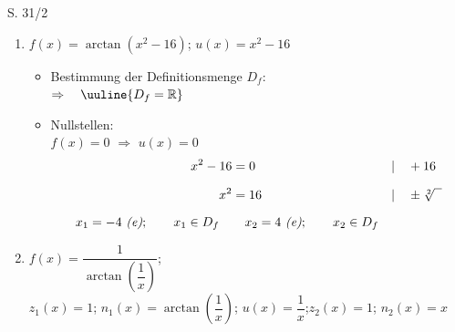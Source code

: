 \begin{Exercise}{S. 31/2}{}
\begin{enumerate}
\begin{enumerate}[label=\alph*)]
{\begin{itemize}[leftmargin=*]
{                        $\Rightarrow \quad \uuline{D_{f} = \left[ \ 3; \infty \ \right[}$
                        }\\[-1.0ex]
                    \item Nullstellen: \\[1.0ex]{
                        $f(x) = 0$ \qquad $\Rightarrow$ \qquad $u(x) = 0$\\[-2.0ex]
                        \begin{align*}
                            x_{1} &= 3 \ \text{\textit{(e)}}; \qquad x_{1} \in D_{f} &&
                        \end{align*}
                        }
                \end{itemize}
                }
            \item[b)] {
                $f(x) = \arctan\left(x^{2} - 16\right)$; \qquad $u(x) = x^{2} - 16$\\[-2.0ex]
                \begin{itemize}[leftmargin=*]
                    \item Bestimmung der Definitionsmenge $D_{f}$: \\[1.0ex]{
                        $\Rightarrow \quad \uuline{D_{f} = \mathbb{R}}$
                        }\\[-1.0ex]
                    \item Nullstellen: \\[1.0ex]{
                        $f(x) = 0$ \qquad $\Rightarrow$ \qquad $u(x) = 0$\\[-2.0ex]
                        \begin{align*}
                            x^{2} - 16 &= 0 &&| \quad + 16\\[1.5ex]
                            x^{2} &= 16 &&| \quad \pm \sqrt[2]{\phantom{x}}\\[1.5ex]
                            x_{1} = -4 \ \text{\textit{(e)}}; \qquad x_{1} \in D_{f} \quad & \quad x_{2} = 4 \ \text{\textit{(e)}}; \qquad x_{2} \in D_{f} &&
                        \end{align*}
                        }
                \end{itemize}
                }
            \item[c)] {
                $f(x) = \dfrac{1}{\arctan\left(\dfrac{1}{x}\right)}$; \\[2.0ex]
                $z_{1}(x) = 1$; \qquad $n_{1}(x) = \arctan\left(\dfrac{1}{x}\right)$; \qquad $u(x) = \dfrac{1}{x}$;\qquad $z_{2}(x) = 1$; \qquad $n_{2}(x) = x$ \\[-2.0ex]
}
\end{enumerate}
\end{enumerate}
\end{Exercise}
